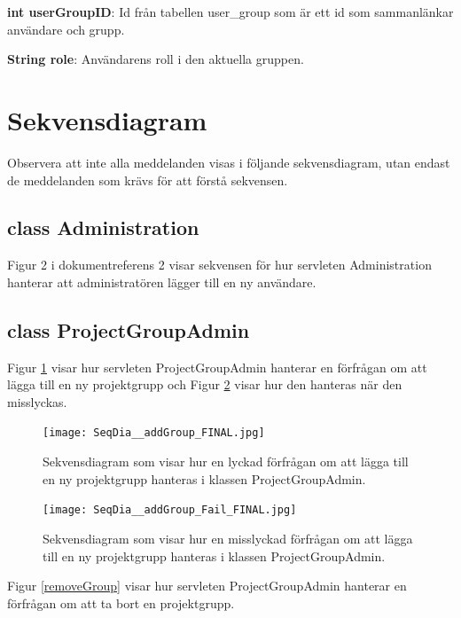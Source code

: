 \documentclass[a4paper]{article}
\begin{document}
\vspace{5mm}
\begin{hangparas}{1.5em}{1}
\textbf{int userGroupID}: Id från tabellen user\_group som är ett id som sammanlänkar användare och grupp.
\end{hangparas}

\vspace{5mm}
\begin{hangparas}{1.5em}{1}
\textbf{String role}: Användarens roll i den aktuella gruppen.
\end{hangparas}

\section{Sekvensdiagram}

Observera att inte alla meddelanden visas i följande sekvensdiagram, utan endast de meddelanden som krävs för att förstå sekvensen.

\subsection{class Administration}
Figur 2 i dokumentreferens 2 visar sekvensen för hur servleten Administration hanterar att administratören lägger till en ny användare.


\subsection{class ProjectGroupAdmin}
Figur \ref{addGroup} visar hur servleten ProjectGroupAdmin hanterar en förfrågan om att lägga till en ny projektgrupp och Figur \ref{addGroupFail} visar hur den hanteras när den misslyckas. 

\begin{figure}[h!]
\centering
\texttt{[image: SeqDia\_\_addGroup\_FINAL.jpg]}
\caption{Sekvensdiagram som visar hur en lyckad förfrågan om att lägga till en ny projektgrupp hanteras i klassen ProjectGroupAdmin. \label{addGroup}}
\end{figure}

\begin{figure}[h!]
\centering
\texttt{[image: SeqDia\_\_addGroup\_Fail\_FINAL.jpg]}
\caption{Sekvensdiagram som visar hur en misslyckad förfrågan om att lägga till en ny projektgrupp hanteras i klassen ProjectGroupAdmin. \label{addGroupFail}}
\end{figure}

\noindent
Figur \ref{removeGroup} visar hur servleten ProjectGroupAdmin hanterar en förfrågan om att ta bort en projektgrupp.
\end{document}
